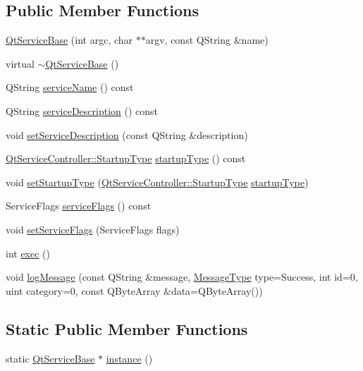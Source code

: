 \subsection*{Public Member Functions}
\begin{DoxyCompactItemize}
\item 
\hyperlink{class_qt_service_base_a75e3f82739df6dc0b9aa899b3f9552eb}{Qt\+Service\+Base} (int argc, char $\ast$$\ast$argv, const Q\+String \&name)
\item 
virtual \hyperlink{class_qt_service_base_a82c0872e5ed2448eff9eb6521f75bfd2}{$\sim$\+Qt\+Service\+Base} ()
\item 
Q\+String \hyperlink{class_qt_service_base_a643f253b3931e6a6c4e8caa190756214}{service\+Name} () const
\item 
Q\+String \hyperlink{class_qt_service_base_a6cf3ef7bc5d85acb31e99a85fde47397}{service\+Description} () const
\item 
void \hyperlink{class_qt_service_base_a09d7547436c65a900f18c58b2a650286}{set\+Service\+Description} (const Q\+String \&description)
\item 
\hyperlink{class_qt_service_controller_a946ac2b079d9760503da923c2eaf0aac}{Qt\+Service\+Controller\+::\+Startup\+Type} \hyperlink{class_qt_service_base_aa1b3bf9b7fc09777b422f49f7bcfbcbe}{startup\+Type} () const
\item 
void \hyperlink{class_qt_service_base_a6beddd54c973c3a7d81075b2f3f80df2}{set\+Startup\+Type} (\hyperlink{class_qt_service_controller_a946ac2b079d9760503da923c2eaf0aac}{Qt\+Service\+Controller\+::\+Startup\+Type} \hyperlink{class_qt_service_base_aa1b3bf9b7fc09777b422f49f7bcfbcbe}{startup\+Type})
\item 
Service\+Flags \hyperlink{class_qt_service_base_aab0b204981c481e098fe72061e3f367a}{service\+Flags} () const
\item 
void \hyperlink{class_qt_service_base_a3f8a07d0cf536720e7fcf1ec562635d1}{set\+Service\+Flags} (Service\+Flags flags)
\item 
int \hyperlink{class_qt_service_base_afae2e589de71c1ae3ae8db3dc9ab9c64}{exec} ()
\item 
void \hyperlink{class_qt_service_base_ac071ce0b30547e17c3b3ca9dcb0108c9}{log\+Message} (const Q\+String \&message, \hyperlink{class_qt_service_base_acffd9389fe7178bf1f35d8bf3dae1095}{Message\+Type} type=Success, int id=0, uint category=0, const Q\+Byte\+Array \&data=Q\+Byte\+Array())
\end{DoxyCompactItemize}
\subsection*{Static Public Member Functions}
\begin{DoxyCompactItemize}
\item 
static \hyperlink{class_qt_service_base}{Qt\+Service\+Base} $\ast$ \hyperlink{class_qt_service_base_a8f030376e32cc47736bfc1a1e1ecf855}{instance} ()
\end{DoxyCompactItemize}

